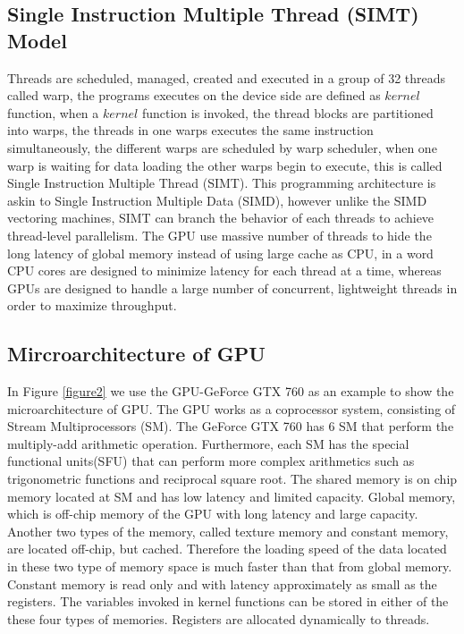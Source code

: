\documentclass[12pt,a4paper,final]{article}
\begin{document}
\begin{spacing}{2.5}
\subsection{Single Instruction Multiple Thread (SIMT) Model} Threads are scheduled, managed, created and executed in a group of 32 threads called warp, the programs executes on the device side are defined as $\mathit{kernel}$ function, when a $\mathit{kernel}$ function is invoked, the thread blocks are partitioned into warps, the threads in one warps executes the same instruction simultaneously, the different warps are scheduled by warp scheduler, when one warp is waiting for data loading the other warps begin to execute, this is called Single Instruction Multiple Thread (SIMT). This programming architecture is askin to Single Instruction Multiple Data (SIMD), however unlike the SIMD vectoring machines, SIMT can branch the behavior of each threads to achieve thread-level parallelism. The GPU use massive number of threads to hide the long latency of global memory instead of using large cache as CPU, in a word CPU cores are designed to minimize latency for each thread at a time, whereas GPUs are designed to handle a large number of concurrent, lightweight threads in order to maximize throughput.
\subsection{Mircroarchitecture of GPU} In Figure \ref{figure2} we use the GPU-GeForce GTX 760 as an example to show the microarchitecture of  GPU. The GPU works as a coprocessor system, consisting of Stream Multiprocessors (SM). The GeForce GTX 760 has 6 SM that perform the multiply-add arithmetic operation. Furthermore, each SM has the special functional units(SFU) that can perform more complex arithmetics such as trigonometric functions and reciprocal square root. The shared memory is on chip memory located at SM and has low latency and limited capacity. Global memory, which is off-chip memory of the GPU with long latency and large capacity. Another two types of the memory, called texture memory and constant memory, are located off-chip, but cached. Therefore the loading speed of the data located in these two type of memory space is much faster than that from global memory. Constant memory is read only and with latency approximately as small as the registers.  The variables invoked in kernel functions can be stored in either of the these four types of memories. Registers are allocated dynamically to threads.

\end{spacing}
\end{document}
